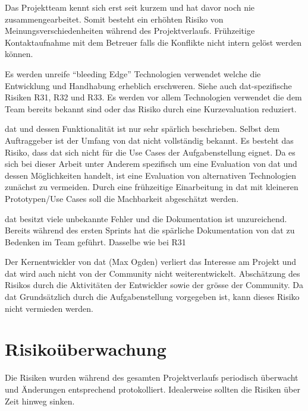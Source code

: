 {Das Projektteam kennt sich erst seit kurzem und hat davor noch nie zusammengearbeitet. Somit besteht ein erhöhten Risiko von Meinungsverschiedenheiten während des Projektverlaufs.}
{Frühzeitige Kontaktaufnahme mit dem Betreuer falls die Konflikte nicht intern gelöst werden können.}

{Es werden unreife ``bleeding Edge'' Technologien verwendet welche die Entwicklung und Handhabung erheblich erschweren. Siehe auch \gls{dat}-spezifische Risiken R31, R32 und R33.}
{Es werden vor allem Technologien verwendet die dem Team bereits bekannt sind oder das Risiko durch eine Kurzevaluation reduziert.}

{\gls{dat} und dessen Funktionalität ist nur sehr spärlich beschrieben. Selbst dem Auftraggeber ist der Umfang von \gls{dat} nicht vollständig bekannt. Es besteht das Risiko, dass \gls{dat} sich nicht für die Use Cases der Aufgabenstellung eignet.}
{Da es sich bei dieser Arbeit unter Anderem spezifisch um eine Evaluation von \gls{dat} und dessen Möglichkeiten handelt, ist eine Evaluation von alternativen Technologien zunächst zu vermeiden. Durch eine frühzeitige Einarbeitung in \gls{dat} mit kleineren Prototypen/Use Cases soll die Machbarkeit abgeschätzt werden.}


{\gls{dat} besitzt viele unbekannte Fehler und die Dokumentation ist unzureichend. Bereits während des ersten Sprints hat die spärliche Dokumentation von \gls{dat} zu Bedenken im Team geführt.}
{Dasselbe wie bei R31}


{Der Kernentwickler von \gls{dat} (Max Ogden) verliert das Interesse am Projekt und \gls{dat} wird auch nicht von der Community nicht weiterentwickelt.}
{Abschätzung des Risikos durch die Aktivitäten der Entwickler sowie der grösse der Community. Da \gls{dat} Grundsätzlich durch die Aufgabenstellung vorgegeben ist, kann dieses Risiko nicht vermieden werden.}


\section{Risikoüberwachung}

Die Risiken wurden während des gesamten Projektverlaufs periodisch überwacht und Änderungen entsprechend protokolliert. Idealerweise sollten die Risiken über Zeit hinweg sinken.

